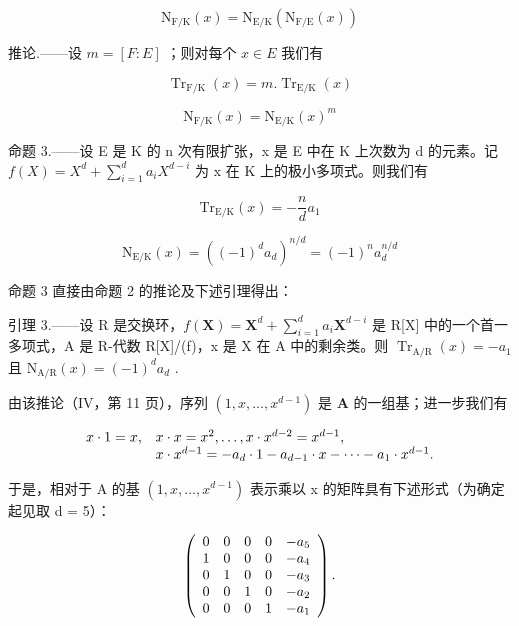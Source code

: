 \[
\mathrm{N} _ {\mathrm{F} / \mathrm{K}} (x) = \mathrm{N} _ {\mathrm{E} / \mathrm{K}} (\mathrm{N} _ {\mathrm{F} / \mathrm{E}} (x))\tag{7}
\]

推论.——设 \(m = [F : E]\) ；则对每个 \(x \in E\) 我们有

\[
\operatorname{Tr} _ {\mathrm{F} / \mathrm{K}} (x) = m. \operatorname{Tr} _ {\mathrm{E} / \mathrm{K}} (x)\tag{8}
\]

\[
\mathrm{N} _ {\mathrm{F} / \mathrm{K}} (x) = \mathrm{N} _ {\mathrm{E} / \mathrm{K}} (x) ^ {m}\tag{9}
\]

命题 3.——设 E 是 K 的 n 次有限扩张，x 是 E 中在 K 上次数为 d 的元素。记 \(f(X) = X^d + \sum_{i=1}^{d} a_i X^{d-i}\) 为 x 在 K 上的极小多项式。则我们有

\[
\mathrm{Tr} _ {\mathrm{E/K}} (x) = - \frac {n}{d} a _ {1}\tag{10}
\]

\[
\mathrm{N} _ {\mathrm{E} / \mathrm{K}} (x) = ((- 1) ^ {d} a _ {d}) ^ {n / d} = (- 1) ^ {n} a _ {d} ^ {n / d}\tag{11}
\]

命题 3 直接由命题 2 的推论及下述引理得出：

引理 3.——设 R 是交换环，\(f(\mathbf{X}) = \mathbf{X}^d + \sum_{i=1}^{d} a_i \mathbf{X}^{d-i}\) 是 R{[}X{]} 中的一个首一多项式，A 是 R-代数 R{[}X{]}/(f)，x 是 X 在 A 中的剩余类。则 \(\operatorname{Tr}_{\mathrm{A/R}}(x) = -a_1\) 且 \(\mathrm{N}_{\mathrm{A/R}}(x) = (-1)^d a_d\) .

由该推论（IV，第 11 页），序列 \((1, x, \ldots, x^{d-1})\) 是 \(\mathbf{A}\) 的一组基；进一步我们有

\[
\begin{array}{r l} x \cdot 1 = x, & x \cdot x = x ^ {2}, \dots , x \cdot x ^ {d - 2} = x ^ {d - 1}, \\ & x \cdot x ^ {d - 1} = - a _ {d} \cdot 1 - a _ {d - 1} \cdot x - \dots - a _ {1} \cdot x ^ {d - 1}. \end{array}
\]

于是，相对于 A 的基 \((1, x, \ldots, x^{d-1})\) 表示乘以 x 的矩阵具有下述形式（为确定起见取 d = 5）：

\[
\left( \begin{array}{c c c c c} 0 & 0 & 0 & 0 & - a _ {5} \\ 1 & 0 & 0 & 0 & - a _ {4} \\ 0 & 1 & 0 & 0 & - a _ {3} \\ 0 & 0 & 1 & 0 & - a _ {2} \\ 0 & 0 & 0 & 1 & - a _ {1} \end{array} \right).
\]

